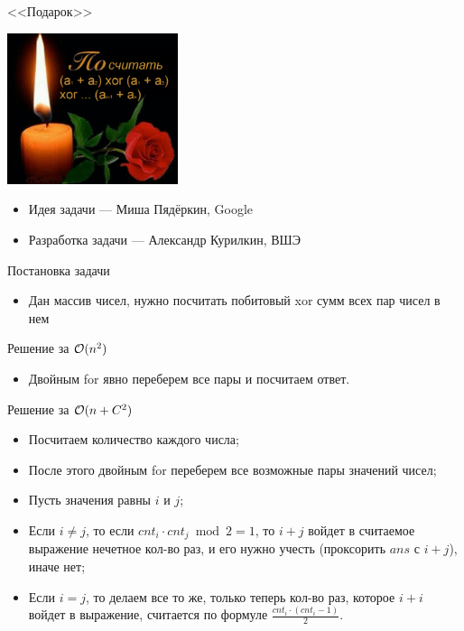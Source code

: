 \begin{frame}
  \begin{center}
    \LARGE <<Подарок>>
  \end{center}

  \begin{center}
      \includegraphics[width=5cm]{memes/e-meme.png}
  \end{center}

  \begin{itemize}
  \item Идея задачи --- Миша Пядёркин, Google
  \item Разработка задачи --- Александр Курилкин, ВШЭ
  \end{itemize}

\end{frame}

\begin{frame}{Постановка задачи}

  \begin{itemize}
  \item Дан массив чисел, нужно посчитать побитовый xor сумм всех пар чисел в нем
  \end{itemize}

\end{frame}

\begin{frame}{Решение за $\mathcal{O}(n^2)$}
  \begin{itemize}
  \item Двойным for явно переберем все пары и посчитаем ответ.
  \end{itemize}
\end{frame}

\begin{frame}{Решение за $\mathcal{O}(n + C^2)$}
  \begin{itemize}
  \item Посчитаем количество каждого числа;
  \item После этого двойным for переберем все возможные пары значений чисел;
  \item Пусть значения равны $i$ и $j$;
  \item Если $i \neq j$, то если $cnt_i \cdot cnt_j \bmod 2 = 1$, то $i + j$ войдет в считаемое выражение нечетное кол-во раз, и его нужно учесть (проксорить $ans$ с $i + j$), иначе нет;
  \item Если $i = j$, то делаем все то же, только теперь кол-во раз, которое $i + i$ войдет в выражение, считается по формуле $\frac{cnt_i \cdot (cnt_{i} - 1)}{2}$.
  \end{itemize}
\end{frame}

